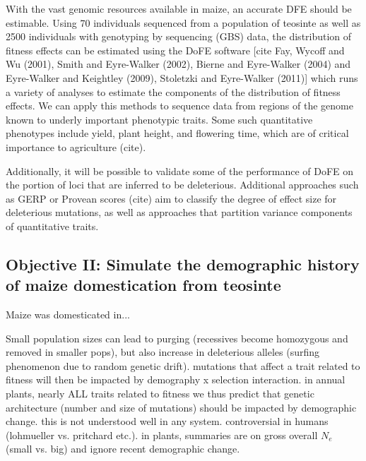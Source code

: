 With the vast genomic resources available in maize, an accurate DFE should be estimable. Using 70 individuals sequenced from a population of teosinte as well as 2500 individuals with genotyping by sequencing (GBS) data, the distribution of fitness effects can be estimated using the DoFE software [cite Fay, Wycoff and Wu (2001), Smith and Eyre-Walker (2002), Bierne and Eyre-Walker (2004) and Eyre-Walker and Keightley (2009), Stoletzki and Eyre-Walker (2011)] which runs a variety of analyses to estimate the components of the distribution of fitness effects. We can apply this methods to sequence data from regions of the genome known to underly important phenotypic traits. Some such quantitative phenotypes include yield, plant height, and flowering time, which are of critical importance to agriculture (cite).

Additionally, it will be possible to validate some of the performance of DoFE on the portion of loci that are inferred to be deleterious. Additional approaches such as GERP or Provean scores (cite) aim to classify the degree of effect size for deleterious mutations, as well as approaches that partition variance components of quantitative traits.
	

\subsection*{Objective II: Simulate the demographic history of maize domestication from teosinte}
Maize was domesticated in...




Small population sizes can lead to purging (recessives become homozygous and removed in smaller pops), but also increase in deleterious alleles (surfing phenomenon due to random genetic drift).
mutations that affect a trait related to fitness will then be impacted by demography x selection interaction.
in annual plants, nearly ALL traits related to fitness
we thus predict that genetic architecture (number and size of mutations) should be impacted by demographic change.
this is not understood well in any system. controversial in humans (lohmueller vs. pritchard etc.). in plants, summaries are on gross overall $N_e$ (small vs. big) and ignore recent demographic change.





